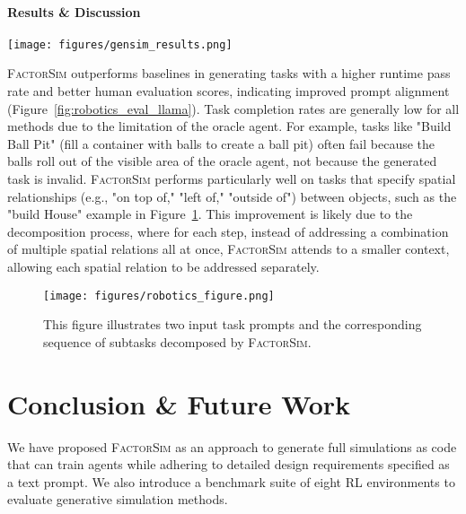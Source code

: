 \documentclass{article}
\theoremstyle{plain}
\theoremstyle{definition}
\theoremstyle{remark}
\newcommand{\method}{\textsc{FactorSim}\xspace}
\begin{document}
\paragraph{Results \& Discussion}
\begin{figure*}[!t]
    \centering
    \vspace{-4mm}
    \texttt{[image: figures/gensim\_results.png]}
        \vspace{-4mm}
    \caption{Performance of \method and GenSim~\cite{wang2023gensim} baselines in generating robotic tasks.}
    \vspace{-4mm}
        \label{fig:robotics_eval_llama}
\end{figure*}
\method outperforms baselines in generating tasks with a higher runtime pass rate and better human evaluation scores, indicating improved prompt alignment (Figure~\ref{fig:robotics_eval_llama}). Task completion rates are generally low for all methods due to the limitation of the oracle agent. For example, tasks like "Build Ball Pit" (fill a container with balls to create a ball pit) often fail because the balls roll out of the visible area of the oracle agent, not because the generated task is invalid. \method performs particularly well on tasks that specify spatial relationships (e.g., "on top of," "left of," "outside of") between objects, such as the "build House" example in Figure~\ref{fig:robotics_demo}. This improvement is likely due to the decomposition process, where for each step, instead of addressing a combination of multiple spatial relations all at once, \method attends to a smaller context, allowing each spatial relation to be addressed separately.


\begin{figure}[!t]
  \centering
  \texttt{[image: figures/robotics\_figure.png]}
   \caption{This figure illustrates two input task prompts and the corresponding sequence of subtasks decomposed by \method.}
   \label{fig:robotics_demo}
\end{figure}





















  


\section{Conclusion \& Future Work}
We have proposed \method as an approach to generate full simulations as code that can train agents while adhering to detailed design requirements specified as a text prompt. We also introduce a benchmark suite of eight RL environments to evaluate generative simulation methods.
\end{document}
